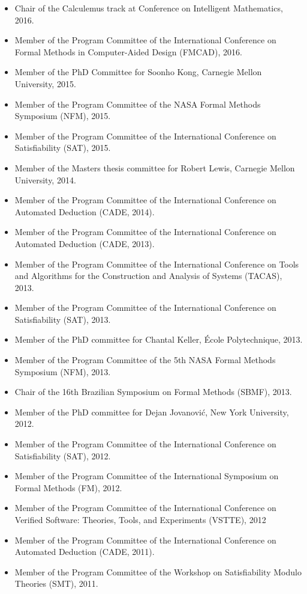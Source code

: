 \documentclass{article}
\begin{document}
\begin{itemize}
\item Chair of the Calculemus track at Conference on Intelligent Mathematics, 2016.
\item Member of the Program Committee of the International Conference on Formal Methods in Computer-Aided Design (FMCAD), 2016.
\item Member of the PhD Committee for Soonho Kong, Carnegie Mellon University, 2015.
\item Member of the Program Committee of the NASA Formal Methods Symposium (NFM), 2015.
\item Member of the Program Committee of the International Conference on Satisfiability (SAT), 2015.
\item Member of the Masters thesis committee for Robert Lewis, Carnegie Mellon University, 2014.
\item Member of the Program Committee of the International Conference on Automated Deduction (CADE, 2014).
\item Member of the Program Committee of the International Conference on Automated Deduction (CADE, 2013).
\item Member of the Program Committee of the International Conference on Tools and Algorithms for the Construction and Analysis of Systems (TACAS), 2013.
\item Member of the Program Committee of the International Conference on Satisfiability (SAT), 2013.
\item Member of the PhD committee for Chantal Keller, \'{E}cole Polytechnique, 2013.
\item Member of the Program Committee of the 5th NASA Formal Methods Symposium (NFM), 2013.
\item Chair of the 16th Brazilian Symposium on Formal Methods (SBMF), 2013.
\item Member of the PhD committee for Dejan Jovanovi\'{c}, New York University, 2012.
\item Member of the Program Committee of the International Conference on Satisfiability (SAT), 2012.
\item Member of the Program Committee of the International Symposium on Formal Methods (FM), 2012.
\item Member of the Program Committee of the International Conference on Verified Software: Theories, Tools, and Experiments (VSTTE), 2012
\item Member of the Program Committee of the International Conference on Automated Deduction (CADE, 2011).
\item Member of the Program Committee of the Workshop on Satisfiability Modulo Theories (SMT), 2011.

\end{itemize}
\end{document}

